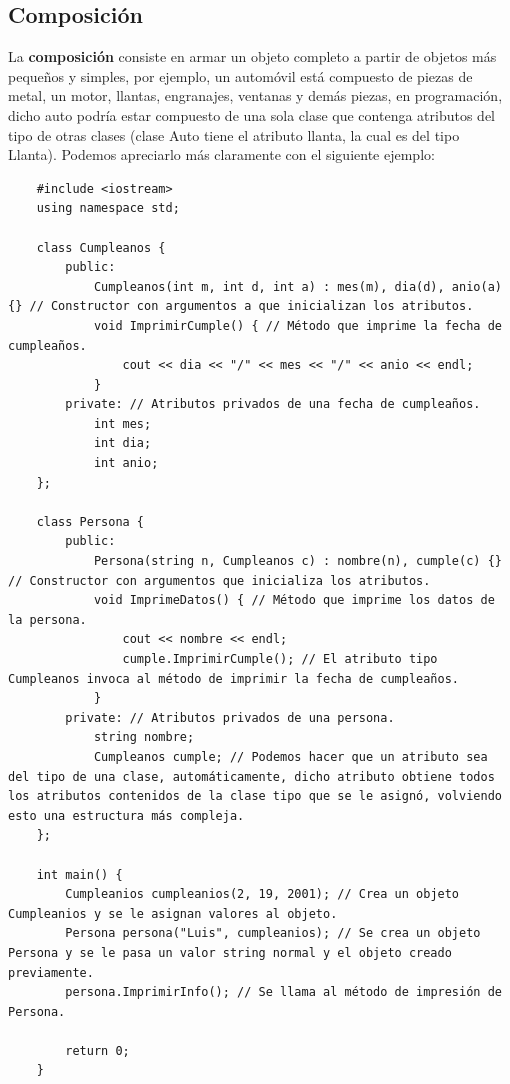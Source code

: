 \subsection{Composición}
\hspace{0.55cm}La \textbf{composición} consiste en armar un objeto completo a partir de objetos más pequeños y simples, por ejemplo, un automóvil está compuesto de piezas de metal, un motor, llantas, engranajes, ventanas y demás piezas, en programación, dicho auto podría estar compuesto de una sola clase que contenga atributos del tipo de otras clases (clase Auto tiene el atributo llanta, la cual es del tipo Llanta). Podemos apreciarlo más claramente con el siguiente ejemplo:
\begin{lstlisting}
    #include <iostream>
    using namespace std;

    class Cumpleanos {
        public:
            Cumpleanos(int m, int d, int a) : mes(m), dia(d), anio(a) {} // Constructor con argumentos a que inicializan los atributos.
            void ImprimirCumple() { // Método que imprime la fecha de cumpleaños.
                cout << dia << "/" << mes << "/" << anio << endl;
            }
        private: // Atributos privados de una fecha de cumpleaños.
            int mes;
            int dia;
            int anio;
    };
    
    class Persona {
        public:
            Persona(string n, Cumpleanos c) : nombre(n), cumple(c) {} // Constructor con argumentos que inicializa los atributos.
            void ImprimeDatos() { // Método que imprime los datos de la persona.
                cout << nombre << endl;
                cumple.ImprimirCumple(); // El atributo tipo Cumpleanos invoca al método de imprimir la fecha de cumpleaños.
            }
        private: // Atributos privados de una persona.
            string nombre;
            Cumpleanos cumple; // Podemos hacer que un atributo sea del tipo de una clase, automáticamente, dicho atributo obtiene todos los atributos contenidos de la clase tipo que se le asignó, volviendo esto una estructura más compleja.
    };
    
    int main() {
        Cumpleanios cumpleanios(2, 19, 2001); // Crea un objeto Cumpleanios y se le asignan valores al objeto.
        Persona persona("Luis", cumpleanios); // Se crea un objeto Persona y se le pasa un valor string normal y el objeto creado previamente.
        persona.ImprimirInfo(); // Se llama al método de impresión de Persona.
    
        return 0;
    }
\end{lstlisting}

